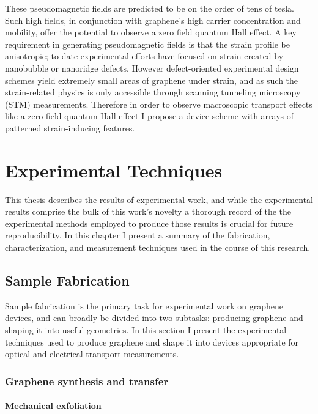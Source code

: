 \documentclass[edeposit,fullpage,draftthesis]{uiucthesis2009}
\begin{document}
        These pseudomagnetic fields are predicted to be on the order of tens of tesla. Such high fields, in conjunction with graphene's high carrier concentration and mobility, offer the potential to observe a zero field quantum Hall effect. A key requirement in generating pseudomagnetic fields is that the strain profile be anisotropic; to date experimental efforts have focused on strain created by nanobubble \cite{Levy2010} or nanoridge \cite{Yan2012} defects. However defect-oriented experimental design schemes yield extremely small areas of graphene under strain, and as such the strain-related physics is only accessible through scanning tunneling microscopy (STM) measurements. Therefore in order to observe macroscopic transport effects like a zero field quantum Hall effect I propose a device scheme with arrays of patterned strain-inducing features.



\chapter{Experimental Techniques}

    This thesis describes the results of experimental work, and while the experimental results comprise the bulk
    of this work's novelty a thorough record of the the experimental methods employed to produce those results 
    is crucial for future reproducibility.
    In this chapter I present a summary of the fabrication, characterization, and measurement techniques used
    in the course of this research.
    
    \section{Sample Fabrication}
    
        Sample fabrication is the primary task for experimental work on graphene devices, 
        and can broadly be divided into two subtasks: producing graphene and shaping it into useful geometries.
        In this section I present the experimental techniques used to produce graphene
        and shape it into devices appropriate for optical and electrical transport measurements.
    
        \subsection{Graphene synthesis and transfer}
        
        
            \subsubsection{Mechanical exfoliation}
            
\end{document}
